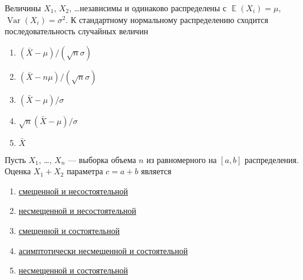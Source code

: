 \documentclass[t]{beamer}
\DeclareMathOperator{\Var}{Var}
\DeclareMathOperator{\E}{\mathbb{E}}
\begin{document}
 \begin{frame} \label{31} 
\begin{block}{31} 

Величины $X_1$, $X_2$, \ldots независимы и одинаково распределены с $\E(X_i)=\mu$, $\Var(X_i)=\sigma^2$. К стандартному нормальному распределению  сходится последовательность случайных величин
 


 \end{block} 
\begin{enumerate} 
\item[] \hyperlink{31-No}{\beamergotobutton{} $(\bar X - \mu) /(\sqrt{n}\sigma)$}
\item[] \hyperlink{31-No}{\beamergotobutton{} $(\bar X - n\mu) /(\sqrt{n}\sigma)$}
\item[] \hyperlink{31-No}{\beamergotobutton{} $(\bar X - \mu) /\sigma$}
\item[] \hyperlink{31-Yes}{\beamergotobutton{} $\sqrt{n}(\bar X - \mu) /\sigma$ }
\item[] \hyperlink{31-No}{\beamergotobutton{} $\bar X$}
\end{enumerate} 
\end{frame} 


 \begin{frame} \label{32} 
\begin{block}{32} 

Пусть $X_1$, \ldots, $X_n$ — выборка объема $n$ из равномерного на $[a, b]$ распределения. Оценка $X_1+X_2$ параметра $c=a+b$ является
 


 \end{block} 
\begin{enumerate} 
\item[] \hyperlink{32-No}{\beamergotobutton{} смещенной и несостоятельной}
\item[] \hyperlink{32-Yes}{\beamergotobutton{} несмещенной и несостоятельной}
\item[] \hyperlink{32-No}{\beamergotobutton{} смещенной и состоятельной}
\item[] \hyperlink{32-No}{\beamergotobutton{} асимптотически несмещенной и состоятельной}
\item[] \hyperlink{32-No}{\beamergotobutton{} несмещенной и состоятельной}
\end{enumerate} 
\end{frame} 
\end{document}
